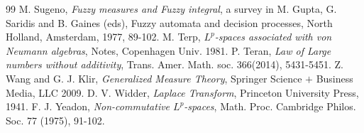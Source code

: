 \documentclass[a4paper,12pt]{amsart}
\begin{document}
\begin{thebibliography}{99}
M. Sugeno,
\textit{Fuzzy measures and Fuzzy integral},
a survey in M. Gupta, G. Saridis and B. Gaines (eds), Fuzzy automata  and 
decision processes, North Holland, Amsterdam, 1977,  89-102.
M. Terp, 
\textit{$L^p$-spaces associated with von Neumann algebras}, 
Notes, Copenhagen Univ. 1981. 
P. Teran, 
\textit{Law of Large numbers without additivity}, 
Trans. Amer. Math. soc. 366(2014), 5431-5451.
Z. Wang and G. J. Klir, 
\textit{Generalized Measure Theory}, Springer Science $+$ Business Media, LLC 2009. 
D. V. Widder, 
\textit{Laplace Transform}, 
Princeton University Press, 1941.
F. J. Yeadon, 
\textit{Non-commutative $L^p$-spaces}, Math. 
Proc. Cambridge Philos. Soc. 77 (1975), 91-102.
\end{thebibliography}
\end{document}
